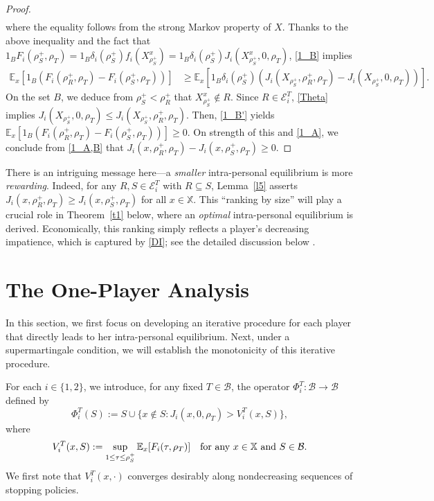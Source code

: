 \documentclass[11pt,reqno]{article}
\numberwithin{equation}{section}
\newcommand{\E}{\mathbb{E}}
\newcommand{\cE}{\mathcal{E}}
\newcommand{\X}{\mathbb{X}}
\newcommand{\B}{\mathcal{B}}
\begin{document}
\begin{proof}
\begin{align}
\end{align} 
where the equality follows from  the strong Markov property of $X$. Thanks to the above inequality and the fact that $1_B F_i(\rho_S^+,\rho_T) = 1_B \delta_i(\rho^+_S) f_i(X^x_{\rho^+_S})=1_B \delta_i(\rho^+_S) J_i(X^x_{\rho^+_S},0,\rho_T)$, \eqref{1_B} implies
\begin{align}\label{1_B'}
\E_x\left[1_B(F_i(\rho^+_R,\rho_T)-F_i(\rho^+_S,\rho_T))\right]&\geq\E_x\left[1_B\delta_i(\rho^+_S)\left(J_i(X_{\rho^+_S},\rho^+_R,\rho_T)-J_i(X_{\rho^+_S},0,\rho_T)\right)\right].%
\end{align}
On the set $B$, we deduce from $\rho^+_S<\rho^+_R$ that $X^x_{\rho^+_S}\notin R$. Since $R\in\cE_i^T$,  \eqref{Theta} implies $J_i(X_{\rho^+_S},0,\rho_T)\le J_i(X_{\rho^+_S},\rho^+_R,\rho_T)$. Then, \eqref{1_B'} yields $\E_x\left[1_B(F_i(\rho^+_R,\rho_T)-F_i(\rho^+_S,\rho_T))\right]\ge 0$. On strength of this and \eqref{1_A}, we conclude from \eqref{1_A,B} that $J_i(x,\rho^+_R,\rho_T)-J_i(x,\rho^+_S,\rho_T)\ge0$.
\end{proof}

There is an intriguing message here---a {\it smaller} intra-personal equilibrium is more {\it rewarding}. Indeed, for any $R,S\in\cE^T_i$ with $R\subseteq S$, Lemma~\ref{l5} asserts $J_i(x,\rho^+_R,\rho_T)\geq J_i(x,\rho^+_S,\rho_T)$ for all $x\in\X$. This ``ranking by size'' will play a crucial role in Theorem~\ref{t1} below, where an {\it optimal} intra-personal equilibrium is derived. Economically, this ranking simply reflects a player's decreasing impatience, which is captured by \eqref{DI}; see the detailed discussion below \cite[Corollary 3.2]{HZ20}. 






\section{The One-Player Analysis}\label{sec:one-player}
In this section, we first focus on developing an iterative procedure for each player that directly leads to her intra-personal equilibrium. Next, under a supermartingale condition, we will establish the monotonicity of this iterative procedure. 

For each $i\in\{1,2\}$, we introduce, for any fixed $T\in\B$, the operator $\Phi_i^T:\B\to\B$ defined by 
\begin{equation}\label{Phi_i^T}
\Phi_i^T(S):=S\cup\{x\notin S: J_i(x,0,\rho_T)>V_i^T(x,S)\},
\end{equation}
where
\begin{equation}\label{V_i^T}
V_i^T(x,S):=\sup_{1\leq\tau\leq\rho^+_S}\E_x[F_i(\tau,\rho_T)]\quad \hbox{for any}\ x\in\X\ \hbox{and}\ S\in\B.
\end{equation}
We first note that $V_i^T(x,\cdot)$ converges desirably along nondecreasing sequences of stopping policies.
\end{document}
